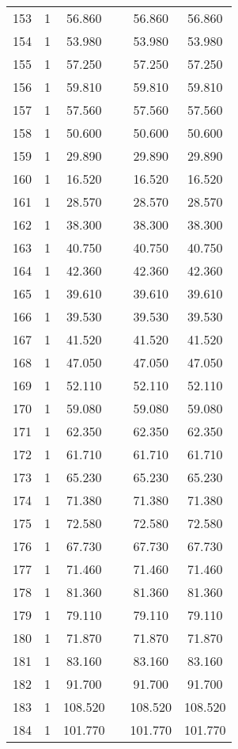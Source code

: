 \begin{table}[!htbp]
\begin{tabular}{@{\extracolsep{5pt}}lccccc}
153 & 1 & 56.860 &  & 56.860 & 56.860 \\ 
154 & 1 & 53.980 &  & 53.980 & 53.980 \\ 
155 & 1 & 57.250 &  & 57.250 & 57.250 \\ 
156 & 1 & 59.810 &  & 59.810 & 59.810 \\ 
157 & 1 & 57.560 &  & 57.560 & 57.560 \\ 
158 & 1 & 50.600 &  & 50.600 & 50.600 \\ 
159 & 1 & 29.890 &  & 29.890 & 29.890 \\ 
160 & 1 & 16.520 &  & 16.520 & 16.520 \\ 
161 & 1 & 28.570 &  & 28.570 & 28.570 \\ 
162 & 1 & 38.300 &  & 38.300 & 38.300 \\ 
163 & 1 & 40.750 &  & 40.750 & 40.750 \\ 
164 & 1 & 42.360 &  & 42.360 & 42.360 \\ 
165 & 1 & 39.610 &  & 39.610 & 39.610 \\ 
166 & 1 & 39.530 &  & 39.530 & 39.530 \\ 
167 & 1 & 41.520 &  & 41.520 & 41.520 \\ 
168 & 1 & 47.050 &  & 47.050 & 47.050 \\ 
169 & 1 & 52.110 &  & 52.110 & 52.110 \\ 
170 & 1 & 59.080 &  & 59.080 & 59.080 \\ 
171 & 1 & 62.350 &  & 62.350 & 62.350 \\ 
172 & 1 & 61.710 &  & 61.710 & 61.710 \\ 
173 & 1 & 65.230 &  & 65.230 & 65.230 \\ 
174 & 1 & 71.380 &  & 71.380 & 71.380 \\ 
175 & 1 & 72.580 &  & 72.580 & 72.580 \\ 
176 & 1 & 67.730 &  & 67.730 & 67.730 \\ 
177 & 1 & 71.460 &  & 71.460 & 71.460 \\ 
178 & 1 & 81.360 &  & 81.360 & 81.360 \\ 
179 & 1 & 79.110 &  & 79.110 & 79.110 \\ 
180 & 1 & 71.870 &  & 71.870 & 71.870 \\ 
181 & 1 & 83.160 &  & 83.160 & 83.160 \\ 
182 & 1 & 91.700 &  & 91.700 & 91.700 \\ 
183 & 1 & 108.520 &  & 108.520 & 108.520 \\ 
184 & 1 & 101.770 &  & 101.770 & 101.770 \\ 

\end{tabular}
\end{table}
